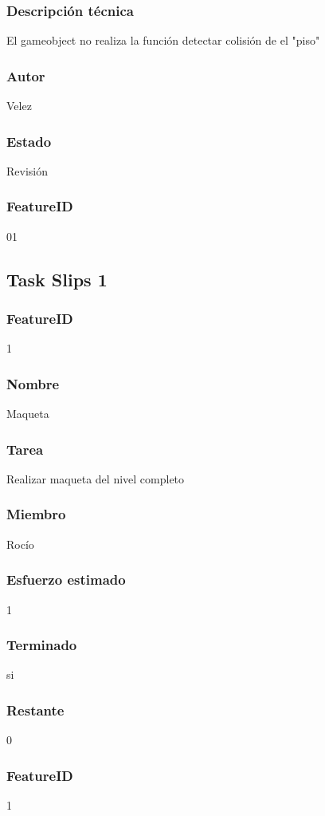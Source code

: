 \subsubsection{Descripción técnica}
El gameobject no realiza la función detectar colisión de el "piso" 
\subsubsection{Autor}
Velez
\subsubsection{Estado}
Revisión
\subsubsection{FeatureID}
01


\subsection{Task Slips 1}


\subsubsection{FeatureID}1
\subsubsection{Nombre}Maqueta
\subsubsection{Tarea}Realizar maqueta del nivel completo
\subsubsection{Miembro}Rocío
\subsubsection{Esfuerzo estimado}1
\subsubsection{Terminado}si
\subsubsection{Restante}0


\subsubsection{FeatureID} 1
